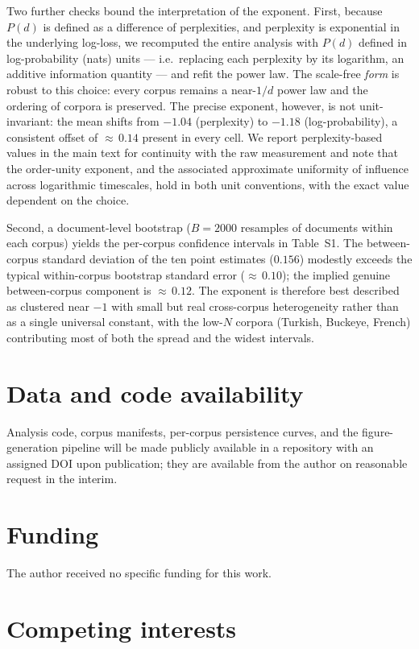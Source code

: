 \documentclass[11pt]{article}
\begin{document}
Two further checks bound the interpretation of the exponent. First, because $P(d)$ is defined as a
difference of perplexities, and perplexity is exponential in the underlying log-loss, we recomputed
the entire analysis with $P(d)$ defined in log-probability (nats) units --- i.e.\ replacing each
perplexity by its logarithm, an additive information quantity --- and refit the power law. The
scale-free \emph{form} is robust to this choice: every corpus remains a near-$1/d$ power law and the
ordering of corpora is preserved. The precise exponent, however, is not unit-invariant: the mean
shifts from $-1.04$ (perplexity) to $-1.18$ (log-probability), a consistent offset of ${\approx}\,0.14$
present in every cell. We report perplexity-based values in the main text for continuity with the raw
measurement and note that the order-unity exponent, and the associated approximate uniformity of
influence across logarithmic timescales, hold in both unit conventions, with the exact value
dependent on the choice.

Second, a document-level bootstrap ($B=2000$ resamples of documents within each corpus) yields the
per-corpus confidence intervals in Table~S1. The between-corpus standard deviation of the ten point
estimates ($0.156$) modestly exceeds the typical within-corpus bootstrap standard error
(${\approx}\,0.10$); the implied genuine between-corpus component is ${\approx}\,0.12$. The exponent is
therefore best described as clustered near $-1$ with small but real cross-corpus heterogeneity rather
than as a single universal constant, with the low-$N$ corpora (Turkish, Buckeye, French) contributing
most of both the spread and the widest intervals.

\section*{Data and code availability}

Analysis code, corpus manifests, per-corpus persistence curves, and the figure-generation pipeline
will be made publicly available in a repository with an assigned DOI upon publication; they are
available from the author on reasonable request in the interim.

\section*{Funding}

The author received no specific funding for this work.

\section*{Competing interests}
\end{document}
